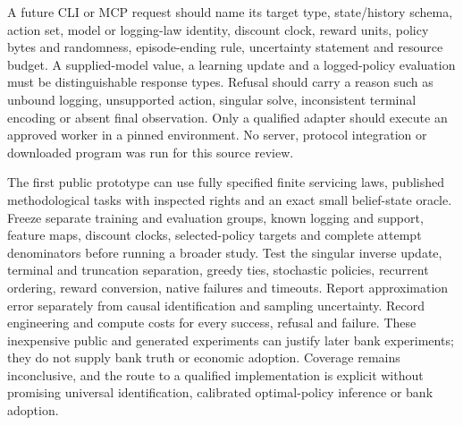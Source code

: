A future CLI or MCP request should name its target type, state/history schema, action set, model or logging-law identity, discount clock, reward units, policy bytes and randomness, episode-ending rule, uncertainty statement and resource budget. A supplied-model value, a learning update and a logged-policy evaluation must be distinguishable response types. Refusal should carry a reason such as unbound logging, unsupported action, singular solve, inconsistent terminal encoding or absent final observation. Only a qualified adapter should execute an approved worker in a pinned environment. No server, protocol integration or downloaded program was run for this source review.\citep{exec24_policyjava_comparison}

The first public prototype can use fully specified finite servicing laws, published methodological tasks with inspected rights and an exact small belief-state oracle. Freeze separate training and evaluation groups, known logging and support, feature maps, discount clocks, selected-policy targets and complete attempt denominators before running a broader study. Test the singular inverse update, terminal and truncation separation, greedy ties, stochastic policies, recurrent ordering, reward conversion, native failures and timeouts. Report approximation error separately from causal identification and sampling uncertainty. Record engineering and compute costs for every success, refusal and failure. These inexpensive public and generated experiments can justify later bank experiments; they do not supply bank truth or economic adoption. Coverage remains inconclusive, and the route to a qualified implementation is explicit without promising universal identification, calibrated optimal-policy inference or bank adoption.\citep{exec24_policyjava_comparison}

